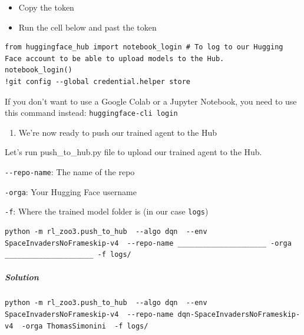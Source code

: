 \documentclass[11pt,a4paper]{article}
\begin{document}

\begin{itemize}
\tightlist
\item
  Copy the token
\item
  Run the cell below and past the token
\end{itemize}

\begin{lstlisting}
from huggingface_hub import notebook_login # To log to our Hugging Face account to be able to upload models to the Hub.
notebook_login()
!git config --global credential.helper store
\end{lstlisting}

If you don't want to use a Google Colab or a Jupyter Notebook, you need to use this command instead: \texttt{huggingface-cli\ login}

\begin{enumerate}
\def\labelenumi{\arabic{enumi}.}
\setcounter{enumi}{2}
\tightlist
\item
  We're now ready to push our trained agent to the Hub
\end{enumerate}

Let's run push\_to\_hub.py file to upload our trained agent to the Hub.

\texttt{-\/-repo-name}: The name of the repo

\texttt{-orga}: Your Hugging Face username

\texttt{-f}: Where the trained model folder is (in our case \texttt{logs})


\begin{lstlisting}
python -m rl_zoo3.push_to_hub  --algo dqn  --env SpaceInvadersNoFrameskip-v4  --repo-name _____________________ -orga _____________________ -f logs/
\end{lstlisting}

\subparagraph{Solution}\label{solution-2}

\begin{lstlisting}
python -m rl_zoo3.push_to_hub  --algo dqn  --env SpaceInvadersNoFrameskip-v4  --repo-name dqn-SpaceInvadersNoFrameskip-v4  -orga ThomasSimonini  -f logs/
\end{lstlisting}
\end{document}
